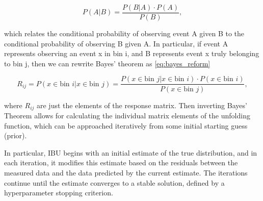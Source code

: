        \begin{equation}
            P(A|B) = \frac{P(B|A) \cdot P(A)}{P(B)},
        \end{equation}\label{eq:bayes}

        which relates the conditional probability of observing event A given B to the conditional probability of observing B given A. In particular, if event A represents observing an event x in bin i, and B represents event x truly belonging to bin j, then we can rewrite Bayes' theorem as \eqref{eq:bayes_reform}


        \begin{equation}
            R_{ij} = P(x \in \text{bin } i| x \in \text{bin } j) = \frac{P(x \in \text{bin } j|x \in \text{bin } i) \cdot P(x \in \text{bin } i)}{P(x \in \text{bin } j)},
        \end{equation}\label{eq:bayes_reform}


        where $R_{ij}$ are just the elements of the response matrix. Then inverting Bayes' Theorem allows for calculating the individual matrix elements of the unfolding function, which can be approached iteratively from some initial starting guess (prior). 

        In particular, IBU begins with an initial estimate of the true distribution, and in each iteration, it modifies this estimate based on the residuals between the measured data and the data predicted by the current estimate. The iterations continue until the estimate converges to a stable solution, defined by a hyperparameter stopping criterion. 


        

